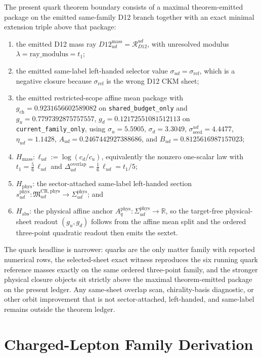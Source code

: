 \documentclass[11pt]{article}
\newcommand{\ophid}[1]{\path{#1}}
\begin{document}
The present quark theorem boundary consists of a maximal theorem-emitted package on the emitted same-family D12 branch together with an exact minimal extension triple above that package:
\begin{enumerate}[leftmargin=2em]
\item the emitted D12 mass ray \(D12_{ud}^{\mathrm{mass}}=\mathcal R_{D12}^{ud}\), with unresolved modulus \(\lambda=\mathrm{ray\_modulus}=t_1\);
\item the emitted same-label left-handed selector value \(\sigma_{ud}=\sigma_{\mathrm{ref}}\), which is a negative closure because \(\sigma_{\mathrm{ref}}\) is the wrong D12 CKM sheet;
\item the emitted restricted-scope affine mean package with \(g_{\mathrm{ch}}=0.9231656602589082\) on \texttt{shared\_budget\_only} and \(g_u=0.7797392875757557\), \(g_d=0.12172551081512113\) on \texttt{current\_family\_only}, using \(\sigma_u=5.5905\), \(\sigma_d=3.3049\), \(\sigma_{\mathrm{seed}}^{ud}=4.4477\), \(\eta_{ud}=1.1428\), \(A_{ud}=0.2467442927388686\), and \(B_{ud}=0.8125616987157023\);
\item \(H_{\mathrm{mass}}:\ell_{ud}:=\log(c_d/c_u)\), equivalently the nonzero one-scalar law \ophid{quark_d12_t1_value_law} with \(t_1=\tfrac56\,\ell_{ud}\) and \(\Delta_{ud}^{\mathrm{overlap}}=\tfrac16\,\ell_{ud}=t_1/5\);
\item \(H_{\mathrm{phys}}\): the sector-attached same-label left-handed section \(s_{ud}^{\mathrm{phys}}:\mathfrak M_{ud}^{\mathrm{CR,phys}}\to\Sigma_{ud}^{\mathrm{phys}}\); and
\item \(H_{\mathrm{abs}}\): the physical affine anchor \(A_q^{\mathrm{phys}}:\Sigma_{ud}^{\mathrm{phys}}\to\mathbb R\), so the target-free physical-sheet readout \((g_u,g_d)\) follows from the affine mean split and the ordered three-point quadratic readout then emits the sextet.
\end{enumerate}

The quark headline is narrower: quarks are the only matter family with reported numerical rows, the selected-sheet exact witness reproduces the six running quark reference masses exactly on the same ordered three-point family, and the stronger physical closure objects sit strictly above the maximal theorem-emitted package on the present ledger. Any same-sheet overlap scan, chirality-basis diagnostic, or other orbit improvement that is not sector-attached, left-handed, and same-label remains outside the theorem ledger.
\section{Charged-Lepton Family Derivation}
\end{document}
